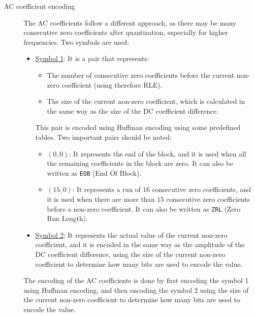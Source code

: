 \begin{description}
    \item[AC coefficient encoding]
    
    The AC coefficients follow a different approach, as there may be many consecutive zero coefficients after quantization, especially for higher frequencies. Two symbols are used:
    \begin{itemize}
        \item \ul{Symbol 1}: It is a pair that represents:
        \begin{itemize}
            \item The number of consecutive zero coefficients before the current non-zero coefficient (using therefore RLE).
            \item The size of the current non-zero coefficient, which is calculated in the same way as the size of the DC coefficient difference.
        \end{itemize}
        This pair is encoded using Huffman encoding using some predefined tables. Two important pairs should be noted:
        \begin{itemize}
            \item $(0,0)$: It represents the end of the block, and it is used when all the remaining coefficients in the block are zero. It can also be written as \texttt{EOB} (End Of Block).
            \item $(15,0)$: It represents a run of $16$ consecutive zero coefficients, and it is used when there are more than $15$ consecutive zero coefficients before a non-zero coefficient. It can also be written as \texttt{ZRL} (Zero Run Length).
        \end{itemize}
        \item \ul{Symbol 2}: It represents the actual value of the current non-zero coefficient, and it is encoded in the same way as the amplitude of the DC coefficient difference, using the size of the current non-zero coefficient to determine how many bits are used to encode the value.
    \end{itemize}

    The encoding of the AC coefficients is done by first encoding the symbol 1 using Huffman encoding, and then encoding the symbol 2 using the size of the current non-zero coefficient to determine how many bits are used to encode the value.
\end{description}